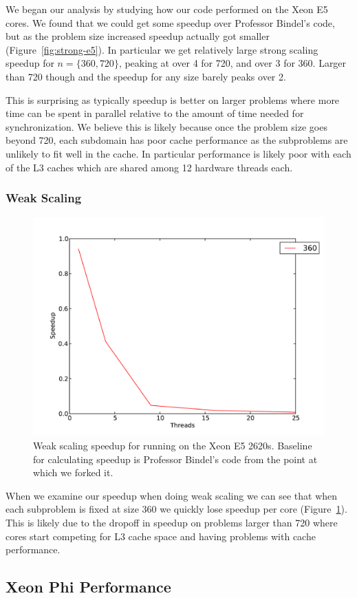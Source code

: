 We began our analysis by studying how our code performed on the Xeon E5 cores. We found that we could get some speedup over Professor Bindel's code, but as the problem size increased speedup actually got smaller (Figure~\ref{fig:strong-e5}). In particular we get relatively large strong scaling speedup for $n=\{360,720\}$, peaking at over 4 for 720, and over 3 for 360. Larger than 720 though and the speedup for any size barely peaks over 2.

This is surprising as typically speedup is better on larger problems where more time can be spent in parallel relative to the amount of time needed for synchronization. We believe this is likely because once the problem size goes beyond 720, each subdomain has poor cache performance as the subproblems are unlikely to fit well in the cache. In particular performance is likely poor with each of the L3 caches which are shared among 12 hardware threads each.

\subsubsection{Weak Scaling}
\begin{figure}[h!]
\centering
\includegraphics[width=0.5\linewidth]{e5_weak_bindel_baseline.pdf}
\caption{Weak scaling speedup for running on the Xeon E5 2620s. Baseline for calculating speedup is Professor Bindel's code from the point at which we forked it.}
\label{fig:weak-e5}
\end{figure}

When we examine our speedup when doing weak scaling we can see that when each subproblem is fixed at size 360 we quickly lose speedup per core (Figure~\ref{fig:weak-e5}). This is likely due to the dropoff in speedup on problems larger than 720 where cores start competing for L3 cache space and having problems with cache performance.

\subsection{Xeon Phi Performance}

